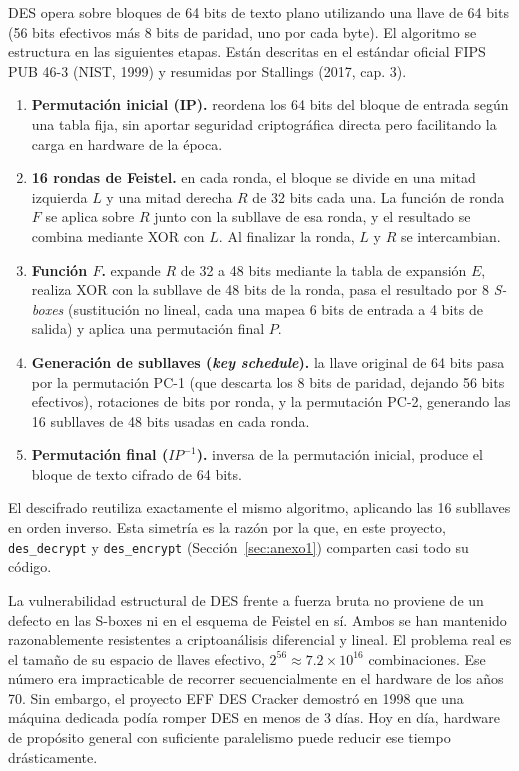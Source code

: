 \documentclass[11pt,letterpaper]{article}
\begin{document}
DES opera sobre bloques de 64 bits de texto plano utilizando una llave
de 64 bits (56 bits efectivos más 8 bits de paridad, uno por cada
byte). El algoritmo se estructura en las siguientes etapas. Están
descritas en el estándar oficial FIPS PUB 46-3 (NIST, 1999) y
resumidas por Stallings (2017, cap. 3).

\begin{enumerate}
    \item \textbf{Permutación inicial (IP).} reordena los 64 bits del
    bloque de entrada según una tabla fija, sin aportar seguridad
    criptográfica directa pero facilitando la carga en hardware de la
    época.
    \item \textbf{16 rondas de Feistel.} en cada ronda, el bloque se
    divide en una mitad izquierda $L$ y una mitad derecha $R$ de 32
    bits cada una. La función de ronda $F$ se aplica sobre $R$ junto
    con la subllave de esa ronda, y el resultado se combina mediante
    XOR con $L$. Al finalizar la ronda, $L$ y $R$ se intercambian.
    \item \textbf{Función $F$.} expande $R$ de 32 a 48 bits mediante la
    tabla de expansión $E$, realiza XOR con la subllave de 48 bits de la
    ronda, pasa el resultado por 8 \textit{S-boxes} (sustitución no
    lineal, cada una mapea 6 bits de entrada a 4 bits de salida) y
    aplica una permutación final $P$.
    \item \textbf{Generación de subllaves (\textit{key schedule}).} la
    llave original de 64 bits pasa por la permutación PC-1 (que
    descarta los 8 bits de paridad, dejando 56 bits efectivos),
    rotaciones de bits por ronda, y la permutación PC-2, generando las
    16 subllaves de 48 bits usadas en cada ronda.
    \item \textbf{Permutación final ($IP^{-1}$).} inversa de la
    permutación inicial, produce el bloque de texto cifrado de 64 bits.
\end{enumerate}

El descifrado reutiliza exactamente el mismo algoritmo, aplicando las
16 subllaves en orden inverso. Esta simetría es la razón por la que, en
este proyecto, \texttt{des\_decrypt} y \texttt{des\_encrypt}
(Sección~\ref{sec:anexo1}) comparten casi todo su código.

La vulnerabilidad estructural de DES frente a fuerza bruta no proviene
de un defecto en las S-boxes ni en el esquema de Feistel en sí. Ambos
se han mantenido razonablemente resistentes a criptoanálisis
diferencial y lineal. El problema real es el tamaño de su espacio de
llaves efectivo, $2^{56} \approx 7.2 \times 10^{16}$ combinaciones. Ese
número era impracticable de recorrer secuencialmente en el hardware de
los años 70. Sin embargo, el proyecto EFF DES Cracker demostró en 1998
que una máquina dedicada podía romper DES en menos de 3 días. Hoy en
día, hardware de propósito general con suficiente paralelismo puede
reducir ese tiempo drásticamente.
\end{document}

